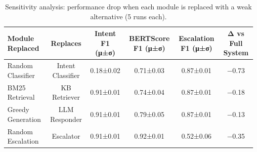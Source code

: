 \begin{table}
\caption{Sensitivity analysis: performance drop when each module is replaced with a weak alternative (5 runs each).}
\label{tab:tab12_sensitivity}
\begin{tabular}{lccccc}
\toprule
Module Replaced & Replaces & Intent F1 (μ±σ) & BERTScore F1 (μ±σ) & Escalation F1 (μ±σ) & Δ vs Full System \\
\midrule
Random Classifier & Intent Classifier & 0.18±0.02 & 0.71±0.03 & 0.87±0.01 & −0.73 \\
BM25 Retrieval & KB Retriever & 0.91±0.01 & 0.74±0.04 & 0.87±0.01 & −0.18 \\
Greedy Generation & LLM Responder & 0.91±0.01 & 0.79±0.05 & 0.87±0.01 & −0.13 \\
Random Escalation & Escalator & 0.91±0.01 & 0.92±0.01 & 0.52±0.06 & −0.35 \\
\bottomrule
\end{tabular}
\end{table}

